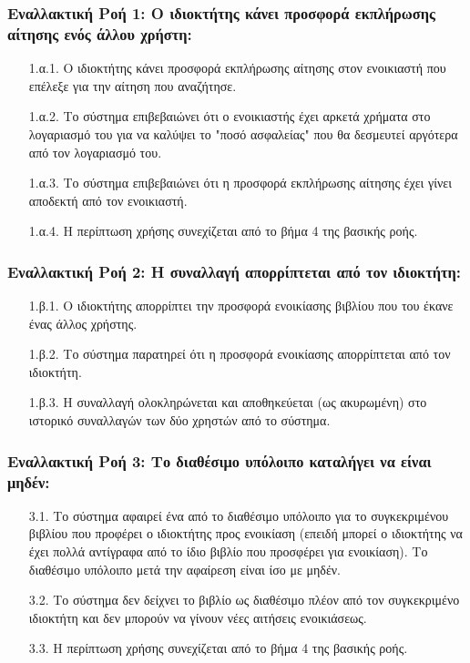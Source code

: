 \documentclass[12pt,a4paper]{article}
\begin{document}
\subsubsection*{Εναλλακτική Ροή 1: Ο ιδιοκτήτης κάνει προσφορά εκπλήρωσης αίτησης ενός άλλου χρήστη:}
\begin{enumerate}
    \item[1.α.1.] Ο ιδιοκτήτης κάνει προσφορά εκπλήρωσης αίτησης στον ενοικιαστή που επέλεξε για την αίτηση που αναζήτησε.
    \item[1.α.2.] Το σύστημα επιβεβαιώνει ότι ο ενοικιαστής έχει αρκετά χρήματα στο λογαριασμό του για να καλύψει το "ποσό ασφαλείας" που θα δεσμευτεί αργότερα από τον λογαριασμό του.
    \item[1.α.3.] Το σύστημα επιβεβαιώνει ότι η προσφορά εκπλήρωσης αίτησης έχει γίνει αποδεκτή από τον ενοικιαστή.
    \item[1.α.4.] Η περίπτωση χρήσης συνεχίζεται από το βήμα 4 της βασικής ροής.
\end{enumerate}

\subsubsection*{Εναλλακτική Ροή 2: Η συναλλαγή απορρίπτεται από τον ιδιοκτήτη:}
\begin{enumerate}
    \item[1.β.1.] Ο ιδιοκτήτης απορρίπτει την προσφορά ενοικίασης βιβλίου που του έκανε ένας άλλος χρήστης.
    \item[1.β.2.] Το σύστημα παρατηρεί ότι η προσφορά ενοικίασης απορρίπτεται από τον ιδιοκτήτη.
    \item[1.β.3.] Η συναλλαγή ολοκληρώνεται και αποθηκεύεται (ως ακυρωμένη) στο ιστορικό συναλλαγών των δύο χρηστών από το σύστημα.
\end{enumerate}

\subsubsection*{Εναλλακτική Ροή 3: Το διαθέσιμο υπόλοιπο καταλήγει να είναι μηδέν:}
\begin{enumerate}
    \item[3.1.] Το σύστημα αφαιρεί ένα από το διαθέσιμο υπόλοιπο για το συγκεκριμένου βιβλίου που προφέρει ο ιδιοκτήτης προς ενοικίαση (επειδή μπορεί ο ιδιοκτήτης να έχει πολλά αντίγραφα από το ίδιο βιβλίο που προσφέρει για ενοικίαση). Το διαθέσιμο υπόλοιπο μετά την αφαίρεση είναι ίσο με μηδέν.
    \item[3.2.] Το σύστημα δεν δείχνει το βιβλίο ως διαθέσιμο πλέον από τον συγκεκριμένο ιδιοκτήτη και δεν μπορούν να γίνουν νέες αιτήσεις ενοικιάσεως.
    \item[3.3.] Η περίπτωση χρήσης συνεχίζεται από το βήμα 4 της βασικής ροής.
\end{enumerate}
\end{document}

